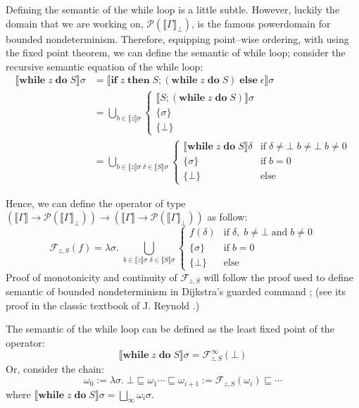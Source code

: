 \documentclass{article}
\newcommand{\sem}[1]{\llbracket #1 \rrbracket }
\begin{document}
Defining the semantic of the while loop is a little subtle.
However, luckily the domain that we are working on, $\mathcal{P}(\sem{\Gamma}_\bot)$, 
is the famous powerdomain for bounded nondeterminism.
Therefore, equipping point--wise ordering, with using the fixed point theorem,
we can define the semantic of while loop;
consider the recursive semantic equation of the while loop:
\begin{align*}
\sem{\textbf{while}\;z\;\textbf{do}\;S}\sigma &= 
\sem{\textbf{if}\;z\;\textbf{then}\;S;(\textbf{while}\;z\;\textbf{do}\;S)\;\textbf{else}\;\epsilon}\sigma \\
&=\bigcup_{b\in\sem{z}\sigma}
\begin{cases}
\sem{S;(\textbf{while}\;z\;\textbf{do}\;S)}\sigma \\
\{\sigma\}\\
\{\bot\}
\end{cases} \\
&=\bigcup_{b\in\sem{z}\sigma\;\delta\in\sem{S}\sigma}
\begin{cases}
\sem{\textbf{while}\;z\;\textbf{do}\;S}\delta &\text{if}\; \delta \neq \bot \;b\neq\bot\;b\neq0\\
\{\sigma\} &\text{if}\; b = 0\\
\{\bot\} &\text{else}
\end{cases}
\end{align*}

Hence, we can define the operator of type 
$(\sem{\Gamma} \to \mathcal{P}(\sem{\Gamma}_\bot)) \to (\sem{\Gamma} \to \mathcal{P}(\sem{\Gamma}_\bot))$
as follow:
\[
\mathcal{F}_{z,S}(f) = \lambda \sigma.\;  
\bigcup_{b\in\sem{z}\sigma\;\delta\in\sem{S}\sigma}
\begin{cases}
f(\delta)&\text{if}\; \delta,\;b \neq \bot\;\text{and}\;b\neq0\\
\{\sigma\} &\text{if}\; b = 0\\
\{\bot\} &\text{else}
\end{cases}
\]
Proof of monotonicity and continuity of $\mathcal{F}_{z,S}$ will follow the proof used to define
semantic of bounded nondeterminism in Dijkstra's guarded command \cite{Dijkstra};
(see its proof in the classic textbook of J. Reynold \cite{reynolds1998}.)

The semantic of the while loop can be defined as 
the least fixed point of the operator:
\[
\sem{\textbf{while}\;z\;\textbf{do}\;S}\sigma = \mathcal{F}_{z,S}^\infty(\bot) 
\]
Or, consider the chain:
\[
\omega_0 := \lambda \sigma.\; \bot \sqsubseteq \omega_1 \cdots \sqsubseteq \omega_{i+1} := \mathcal{F}_{z,S}(\omega_i) \sqsubseteq \cdots
\]
where $\sem{\textbf{while}\;z\;\textbf{do}\;S}\sigma = \bigsqcup_\infty \omega_i \sigma$.
\end{document}

